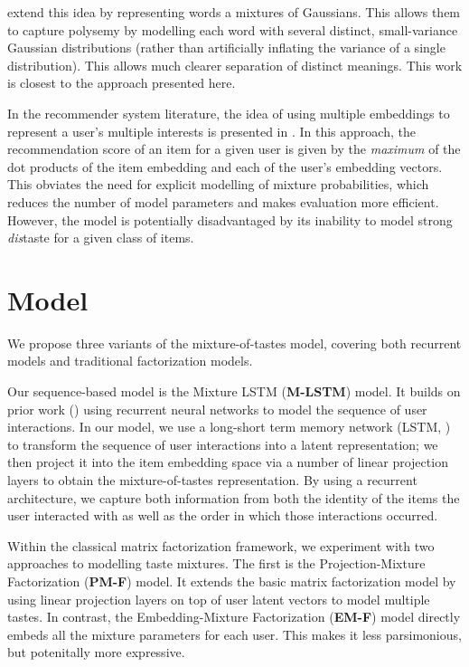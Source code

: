 \documentclass[sigconf]{acmart}
\begin{document}
\citet{athiwaratkun2017multimodal} extend this idea by representing words a mixtures of Gaussians. This allows them to capture polysemy by modelling each word with several distinct, small-variance Gaussian distributions (rather than artificially inflating the variance of a single distribution). This allows much clearer separation of distinct meanings. This work is closest to the approach presented here.

In the recommender system literature, the idea of using multiple embeddings to represent a user's multiple interests is presented in \citet{weston2013nonlinear}. In this approach, the recommendation score of an item for a given user is given by the \emph{maximum} of the dot products of the item embedding and each of the user's embedding vectors. This obviates the need for explicit modelling of mixture probabilities, which reduces the number of model parameters and makes evaluation more efficient. However, the model is potentially disadvantaged by its inability to model strong \emph{dis}taste for a given class of items.

\section{Model}
We propose three variants of the mixture-of-tastes model, covering both recurrent models and traditional factorization models.

Our sequence-based model is the Mixture LSTM (\textbf{M-LSTM}) model. It builds on prior work (\citet{wu2017recurrent, hidasi2015session}) using recurrent neural networks to model the sequence of user interactions. In our model, we use a long-short term memory network (LSTM, \cite{hochreiter1997long}) to transform the sequence of user interactions into a latent representation; we then project it into the item embedding space via a number of linear projection layers to obtain the mixture-of-tastes representation. By using a recurrent architecture, we capture both information from both the identity of the items the user interacted with as well as the order in which those interactions occurred.

Within the classical matrix factorization framework, we experiment with two approaches to modelling taste mixtures. The first is the Projection-Mixture Factorization (\textbf{PM-F}) model. It extends the basic matrix factorization model by using linear projection layers on top of user latent vectors to model multiple tastes. In contrast, the Embedding-Mixture Factorization (\textbf{EM-F}) model directly embeds all the mixture parameters for each user. This makes it less parsimonious, but potenitally more expressive.
\end{document}
